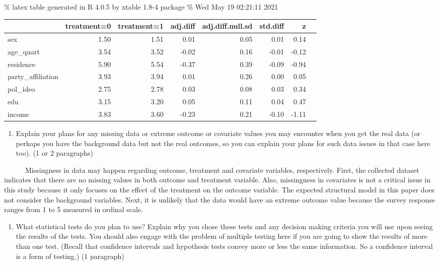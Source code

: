 \documentclass[
  11pt,
]{article}
\providecommand{\tightlist}{%
  \setlength{\itemsep}{0pt}\setlength{\parskip}{0pt}}
\begin{document}
\% latex table generated in R 4.0.5 by xtable 1.8-4 package \% Wed May
19 02:21:11 2021

\begin{table}[ht]
\centering
\begin{tabular}{lrrrrrrr}
  \hline
 & treatment=0 & treatment=1 & adj.diff & adj.diff.null.sd & std.diff & z &  \\ 
  \hline
sex & 1.50 & 1.51 & 0.01 & 0.05 & 0.01 & 0.14 &     \\ 
  age\_quart & 3.54 & 3.52 & -0.02 & 0.16 & -0.01 & -0.12 &     \\ 
  residence & 5.90 & 5.54 & -0.37 & 0.39 & -0.09 & -0.94 &     \\ 
  party\_affiliation & 3.93 & 3.94 & 0.01 & 0.26 & 0.00 & 0.05 &     \\ 
  pol\_ideo & 2.75 & 2.78 & 0.03 & 0.08 & 0.03 & 0.34 &     \\ 
  edu & 3.15 & 3.20 & 0.05 & 0.11 & 0.04 & 0.47 &     \\ 
  income & 3.83 & 3.60 & -0.23 & 0.21 & -0.10 & -1.11 &     \\ 
   \hline
\end{tabular}
\end{table}

\begin{enumerate}
\def\labelenumi{\arabic{enumi}.}
\setcounter{enumi}{6}
\tightlist
\item
  Explain your plans for any missing data or extreme outcome or
  covariate values you may encounter when you get the real data (or
  perhaps you have the background data but not the real outcomes, so you
  can explain your plans for such data issues in that case here too). (1
  or 2 paragraphs)
\end{enumerate}

~~~~~~Missingness in data may happen regarding outcome, treatment and
covariate variables, respectively. First, the collected dataset
indicates that there are no missing values in both outcome and treatment
variable. Also, missingness in covariates is not a critical issue in
this study because it only focuses on the effect of the treatment on the
outcome variable. The expected structural model in this paper does not
consider the background variables. Next, it is unlikely that the data
would have an extreme outcome value because the survey response ranges
from 1 to 5 measured in ordinal scale.

\begin{enumerate}
\def\labelenumi{\arabic{enumi}.}
\setcounter{enumi}{7}
\tightlist
\item
  What statistical tests do you plan to use? Explain why you chose these
  tests and any decision making criteria you will use upon seeing the
  results of the tests. You should also engage with the problem of
  multiple testing here if you are going to show the results of more
  than one test. (Recall that confidence intervals and hypothesis tests
  convey more or less the same information. So a confidence interval is
  a form of testing.) (1 paragraph)
\end{enumerate}
\end{document}
